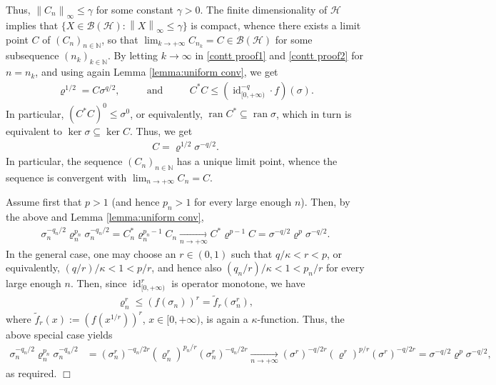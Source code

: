 \documentclass[unsortedaddress,superscriptaddress,pra,notitlepage]{revtex4}
\newenvironment{proof}[1][Proof]{\begin{trivlist}
\item[\hskip \labelsep {\bfseries #1}]}{\hfill$\Box$\end{trivlist}}
\def\B{{\mathcal B}}
\def\bN{\mathbb{N}}
\def\rho{\varrho}
\def\hil{{\mathcal H}}
\def\cH{\mathcal{H}}
\def\pwr{\kappa}
\newcommand{\ds}{\mbox{ }\mbox{ }}
\newcommand{\vnorm}[1]{\left\| #1\right\|_{\infty}}
\DeclareMathOperator{\id}{id}
\DeclareMathOperator{\ran}{ran}
\begin{document}
\begin{proof}
Thus, $\vnorm{C_n}\le\gamma$ for some constant $\gamma>0$. 
The finite dimensionality of $\hil$ implies that 
$\{X\in \B(\cH):\vnorm{X}\le\gamma\}$ is compact, whence there exists a limit point
$C$ of $(C_n)_{n\in\bN}$, so that $\lim_{k\to+\infty}C_{n_k}= C\in \B(\cH)$ for some subsequence $(n_k)_{k\in\bN}$. 
By letting
$k\to\infty$ in \eqref{contt proof1} and \eqref{contt proof2} for $n=n_k$, 
and using again Lemma \ref{lemma:uniform conv}, we get
\begin{align}
\rho^{1/2}=C\sigma^{q/2},\ds\ds\text{and}\ds\ds C^*C\le(\id_{[0,+\infty)}^{-q}\cdot f)(\sigma).
\end{align}
In particular, $(C^*C)^0\le \sigma^0$, or equivalently, 
$\ran C^* \subseteq\ran \sigma$, which in turn is equivalent to 
$\ker\sigma\subseteq\ker C$. 
Thus, %
we get
\begin{align*}
C=\rho^{1/2}\sigma^{-q/2}.
\end{align*}
In particular, the sequence $(C_n)_{n\in\bN}$ has a unique limit point, 
whence the sequence is convergent with 
$\lim_{n\to+\infty}C_n=C$. 

Assume first that $p>1$ (and hence $p_n>1$ for every large enough $n$). Then, by the above and Lemma \ref{lemma:uniform conv},
\begin{align*}
\sigma_n^{-q_n/2}\rho_n^{p_n}\sigma_n^{-q_n/2}=C_n^*\rho_n^{p_n-1}C_n
\xrightarrow[n\to+\infty]{} C^*\rho^{p-1}C=\sigma^{-q/2}\rho^p\sigma^{-q/2}.
\end{align*}
In the general case,
one may choose an $r\in(0,1)$ such that 
$q/\pwr<r<p$, or equivalently, 
$(q/r)/\pwr<1<p/r$,
and hence also 
$(q_n/r)/\pwr<1<p_n/r$ for every large enough $n$. 
Then,
since $\id_{[0,+\infty)}^r$ is operator monotone, we have
\begin{align*}
\rho_n^r\le (f(\sigma_n))^r=\tilde f_r(\sigma_n^r),
\end{align*}
where $\tilde f_r(x):=(f(x^{1/r}))^r$, $x\in[0,+\infty)$, is again a $\pwr$-function. 
Thus, the above special case yields
\begin{align*}
\sigma_n^{-q_n/2}\rho_n^{p_n}\sigma_n^{-q_n/2}&=(\sigma_n^r)^{-q_n/2r}(\rho_n^r)^{p_n/r}(\sigma_n^r)^{-q_n/2r}\xrightarrow[n\to+\infty]{}(\sigma^r)^{-q/2r}(\rho^r)^{p/r}(\sigma^r)^{-q/2r}=\sigma^{-q/2}\rho^p\sigma^{-q/2},
\end{align*}
as required.
\end{proof}
\end{document}
